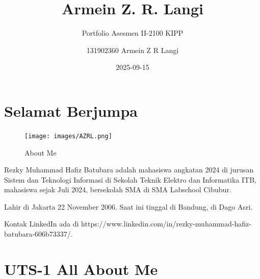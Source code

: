 \documentclass[
  letterpaper,
  DIV=11,
  numbers=noendperiod]{scrreprt}
\title{Armein Z. R. Langi}
\subtitle{Portfolio Asesmen II-2100 KIPP}
\author{131902360 Armein Z R Langi}
\date{2025-09-15}
\renewcommand*\contentsname{Table of contents}
\newcommand\contentsname{Table of contents}
\begin{document}
\maketitle

\renewcommand*\contentsname{Table of contents}
{
\hypersetup{linkcolor=}
\setcounter{tocdepth}{2}
\tableofcontents
}


\chapter*{Selamat Berjumpa}\label{selamat-berjumpa}


\begin{figure}[H]

{\centering \texttt{[image: images/AZRL.png]}

}

\caption{About Me}

\end{figure}%

Rezky Muhammad Hafiz Batubara adalah mahasiswa angkatan 2024 di jurusan
Sistem dan Teknologi Informasi di Sekolah Teknik Elektro dan Informatika
ITB, mahasiswa sejak Juli 2024, bersekolah SMA di SMA Labschool Cibubur.

Lahir di Jakarta 22 November 2006. Saat ini tinggal di Bandung, di Dago
Asri.

Kontak LinkedIn ada di
https://www.linkedin.com/in/rezky-muhammad-hafiz-batubara-606b73337/.


\chapter{UTS-1 All About Me}\label{uts-1-all-about-me}
\end{document}
